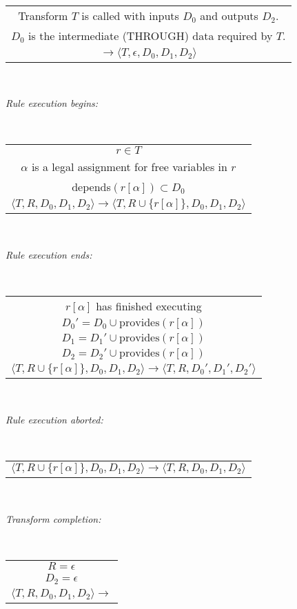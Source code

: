 \documentclass[11pt]{article}
\begin{document}
~

\begin{tabular}{c}
Transform $T$ is called with inputs $D_0$ and outputs $D_2$.
\\
$D_0$ is the intermediate (THROUGH) data required by $T$.
\\\hline
$\rightarrow \langle T, \epsilon, D_0, D_1, D_2 \rangle$ 
\end{tabular}

~

\noindent
{\it
Rule execution begins:}

~

\begin{tabular}{c}
$r \in T$ \\
$\alpha$ is a legal assignment for free variables in $r$ \\
depends$(r[\alpha]) \subset D_0$  
\\\hline
$
\langle T, R, D_0, D_1, D_2 \rangle
\rightarrow
\langle T, R \cup \{r[\alpha]\}, D_0, D_1, D_2 \rangle$ 
\end{tabular}

~

\noindent
{\it
Rule execution ends:}

~

\begin{tabular}{c}
$r[\alpha]$ has finished executing
\\
$D_0' = D_0 \cup {\mbox{provides}(r[\alpha])}$
\\
$D_1 = D_1' \cup {\mbox{provides}(r[\alpha])}$
\\
$D_2 = D_2' \cup {\mbox{provides}(r[\alpha])}$
\\\hline
$
\langle T, R \cup \{r[\alpha]\}, D_0, D_1, D_2 \rangle
\rightarrow
\langle T, R, D_0', D_1', D_2' \rangle$
\end{tabular}

~

\noindent
{\it
Rule execution aborted:}

~

\begin{tabular}{c}
$
\langle T, R \cup \{r[\alpha]\}, D_0, D_1, D_2 \rangle
\rightarrow
\langle T, R, D_0, D_1, D_2 \rangle$
\end{tabular}


~

\noindent
{\it
Transform completion:}

~

\begin{tabular}{c}
$R=\epsilon$
\\
$D_2=\epsilon$
\\\hline
$
\langle T, R, D_0, D_1, D_2 \rangle
\rightarrow$
\end{tabular}
\end{document}
